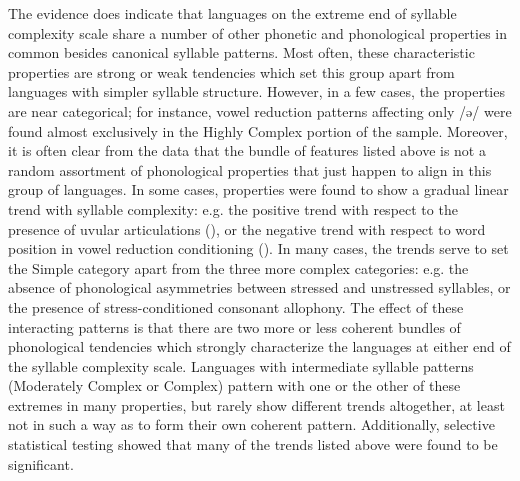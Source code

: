   The evidence does indicate that languages on the extreme end of syllable complexity scale share a number of other phonetic and phonological properties in common besides canonical syllable patterns. Most often, these characteristic properties are strong or weak tendencies which set this group apart from languages with simpler syllable structure. However, in a few cases, the properties are near categorical; for instance, vowel reduction patterns affecting only /ə/ were found almost exclusively in the Highly Complex portion of the sample. Moreover, it is often clear from the data that the bundle of features listed above is not a random assortment of phonological properties that just happen to align in this group of languages. In some cases, properties were found to show a gradual linear trend with syllable complexity: e.g. the positive trend with respect to the presence of uvular articulations (), or the negative trend with respect to word position in vowel reduction conditioning (). In many cases, the trends serve to set the Simple category apart from the three more complex categories: e.g. the absence of phonological asymmetries between stressed and unstressed syllables, or the presence of stress-conditioned consonant allophony. The effect of these interacting patterns is that there are two more or less coherent bundles of phonological tendencies which strongly characterize the languages at either end of the syllable complexity scale. Languages with intermediate syllable patterns (Moderately Complex or Complex) pattern with one or the other of these extremes in many properties, but rarely show different trends altogether, at least not in such a way as to form their own coherent pattern. Additionally, selective statistical testing showed that many of the trends listed above were found to be significant.

